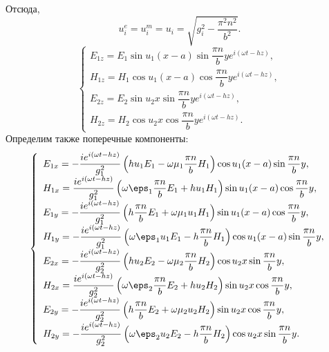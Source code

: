 \documentclass[a4paper]{hedsemwork}
\renewcommand{\frac}{\dfrac}
\begin{document}
Отсюда,
\[
    u^e_i = u^m_i = u_i = \sqrt{g_i^2 - \frac{\pi^2n^2}{b^2}}.
\]
\[
    \left\{
    \begin{array}{l}
        E_{1z} = E_1\sin u_1 (x-a) \sin \frac{\pi n}{b}y
        e^{i(\omega t - h z)},\\
        H_{1z} = H_1\cos u_1 (x-a) \cos \frac{\pi n}{b}y
        e^{i(\omega t - h z)},\\
        E_{2z} = E_2\sin u_2 x \sin \frac{\pi n}{b}y
        e^{i(\omega t - h z)},\\
        H_{2z} = H_2\cos u_2 x \cos \frac{\pi n}{b}y
        e^{i(\omega t - h z)}.
    \end{array}
    \right.
\]
Определим также поперечные компоненты:
\[
    \left\{
    \begin{array}{l}
        E_{1x} = -\frac{i e^{i(\omega t - h z)}}{g_1^2}
        \left(h u_1 E_1 - \omega\mu_1\frac{\pi n}{b}H_1\right)
        \cos u_1 (x-a) \sin \frac{\pi n}{b}y,\\
        H_{1x} = \frac{i e^{i(\omega t - h z)}}{g_1^2}
        \left(\omega\eps_1\frac{\pi n}{b}E_1+h u_1 H_1\right)
        \sin u_1 (x-a) \cos \frac{\pi n}{b}y,\\
        E_{1y} = -\frac{i e^{i(\omega t - h z)}}{g_1^2}
        \left(h \frac{\pi n}{b} E_1 + \omega\mu_1u_1H_1\right)
        \sin u_1 (x-a) \cos \frac{\pi n}{b}y,\\
        H_{1y} = -\frac{i e^{i(\omega t - h z)}}{g_1^2}
        \left(\omega\eps_1u_1E_1-h \frac{\pi n}{b} H_1\right)
        \cos u_1 (x-a) \sin \frac{\pi n}{b}y,\\
        E_{2x} = -\frac{i e^{i(\omega t - h z)}}{g_2^2}
        \left(h u_2 E_2 - \omega\mu_2\frac{\pi n}{b}H_2\right)
        \cos u_2 x \sin \frac{\pi n}{b}y,\\
        H_{2x} = \frac{i e^{i(\omega t - h z)}}{g_2^2}
        \left(\omega\eps_2\frac{\pi n}{b}E_2+h u_2 H_2\right)
        \sin u_2 x \cos \frac{\pi n}{b}y,\\
        E_{2y} = -\frac{i e^{i(\omega t - h z)}}{g_2^2}
        \left(h \frac{\pi n}{b} E_2 + \omega\mu_2u_2H_2\right)
        \sin u_2 x \cos \frac{\pi n}{b}y,\\
        H_{2y} = -\frac{i e^{i(\omega t - h z)}}{g_2^2}
        \left(\omega\eps_2u_2E_2-h \frac{\pi n}{b} H_2\right)
        \cos u_2 x \sin \frac{\pi n}{b}y.
    \end{array}
    \right.
\]
\end{document}
